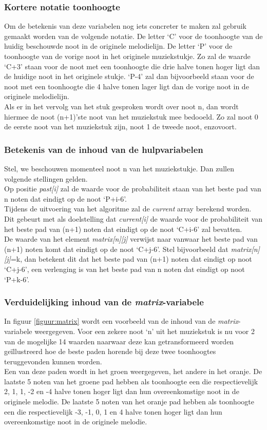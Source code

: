 \subsubsection{Kortere notatie toonhoogte}
Om de betekenis van deze variabelen nog iets concreter te maken zal gebruik gemaakt worden van de volgende notatie. De letter `C' voor de toonhoogte van de huidig beschouwde noot in de originele melodielijn. De letter `P' voor de toonhoogte van de vorige noot in het originele muziekstukje. Zo zal de waarde `C+3' staan voor de noot met een toonhoogte die drie halve tonen hoger ligt dan de huidige noot in het originele stukje. `P-4' zal dan bijvoorbeeld staan voor de noot met een toonhoogte die 4 halve tonen lager ligt dan de vorige noot in de originele melodielijn.\\
Als er in het vervolg van het stuk gesproken wordt over noot n, dan wordt hiermee de noot (n+1)'ste noot van het muziekstuk mee bedooeld. Zo zal noot 0 de eerste noot van het muziekstuk zijn, noot 1 de tweede noot, enzovoort.

\subsubsection{Betekenis van de inhoud van de hulpvariabelen} 
Stel, we beschouwen momenteel noot n van het muziekstukje. Dan zullen volgende stellingen gelden.\\ 
Op positie \textit{past[i]} zal de waarde voor de probabiliteit staan van het beste pad van n noten dat eindigt op de noot `P+i-6'.\\ 
Tijdens de uitvoering van het algoritme zal de \textit{current} array berekend worden. Dit gebeurt met als doelstelling dat \textit{current[i]} de waarde voor de probabiliteit van het beste pad van (n+1) noten dat eindigt op de noot `C+i-6' zal bevatten.\\ 
De waarde van het element \textit{matrix[n][j]} verwijst naar vanwaar het beste pad van (n+1) noten komt dat eindigt op de noot `C+j-6'. Stel bijvoorbeeld dat \textit{matrix[n][j]}=k, dan betekent dit dat het beste pad van (n+1) noten dat eindigt op noot `C+j-6', een verlenging is van het beste pad van n noten dat eindigt op noot `P+k-6'.

\subsubsection{Verduidelijking inhoud van de \textit{matrix}-variabele}
In figuur \ref{figuur:matrix} wordt een voorbeeld van de inhoud van de \textit{matrix}-variabele weergegeven. Voor een zekere noot `n' uit het muziekstuk is nu voor 2 van de mogelijke 14 waarden naarwaar deze kan getransformeerd worden ge\"illustreerd hoe de beste paden horende bij deze twee toonhoogtes teruggevonden kunnen worden.\\ 
Een van deze paden wordt in het groen weergegeven, het andere in het oranje. De laatste 5 noten van het groene pad hebben als toonhoogte een die respectievelijk 2, 1, 1, -2 en -4 halve tonen hoger ligt dan hun overeenkomstige noot in de originele melodie. De laatste 5 noten van het oranje pad hebben als toonhoogte een die respectievelijk -3, -1, 0, 1 en 4 halve tonen hoger ligt dan hun overeenkomstige noot in de originele melodie. 

